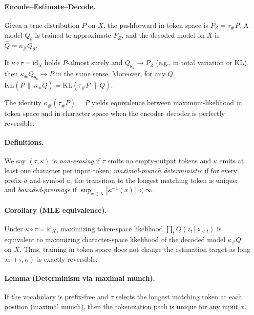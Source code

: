 \paragraph{Encode–Estimate–Decode.}
Given a true distribution $P$ on $X$, the pushforward in token space is $P_Z=\tau_{\#}P$. A model $Q_\theta$ is trained to approximate $P_Z$, and the decoded model on $X$ is $\widehat{Q}=\kappa_{\#}Q_\theta$.

\makeatletter
{}
\makeatother

\begin{theorem}\label{thm:consistency}
If $\kappa\circ\tau=\mathrm{id}_X$ holds $P$-almost surely and $Q_{\theta_n}\to P_Z$ (e.g., in total variation or KL), then $\kappa_{\#}Q_{\theta_n}\to P$ in the same sense. Moreover, for any $Q$, $\mathrm{KL}(P\,\|\,\kappa_{\#}Q)=\mathrm{KL}(\tau_{\#}P\,\|\,Q)$.
\end{theorem}

\noindent The identity $\kappa_{\#}(\tau_{\#}P)=P$ yields equivalence between maximum-likelihood in token space and in character space when the encoder–decoder is perfectly reversible.

\paragraph{Definitions.}
We say $(\tau,\kappa)$ is \emph{non-erasing} if $\tau$ emits no empty-output tokens and $\kappa$ emits at least one character per input token; \emph{maximal-munch deterministic} if for every prefix $u$ and symbol $a$, the transition to the longest matching token is unique; and \emph{bounded-preimage} if $\sup_{x\in X}|\kappa^{-1}(x)|<\infty$.

\paragraph{Corollary (MLE equivalence).}
Under $\kappa\circ\tau=\mathrm{id}_X$, maximizing token-space likelihood $\prod_t Q(z_t\,|\,z_{<t})$ is equivalent to maximizing character-space likelihood of the decoded model $\kappa_{\#}Q$ on $X$.
Thus, training in token space does not change the estimation target as long as $(\tau,\kappa)$ is exactly reversible.

\paragraph{Lemma (Determinism via maximal munch).}
If the vocabulary is prefix-free and $\tau$ selects the longest matching token at each position (maximal munch), then the tokenization path is unique for any input $x$.

